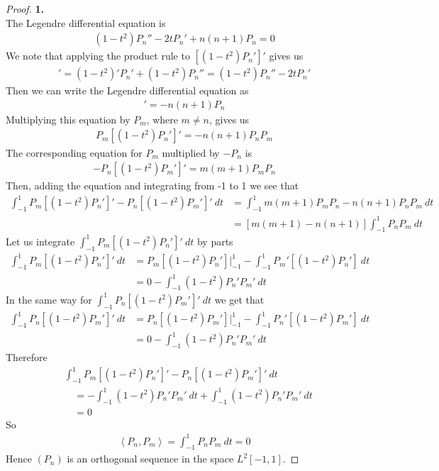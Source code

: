 \documentclass[11pt]{article}
\newcommand{\inprd}[1]{\left\langle{#1}\right\rangle}
\theoremstyle{definition}
\begin{document}
\begin{proof}{\textbf{1.}}\\
The Legendre differential equation is
\begin{align*}
    (1 - t^2)P_n'' - 2tP_n' + n(n + 1)P_n = 0
\end{align*}
We note that applying the product rule to $[(1 - t^2)P_n']'$ gives us
\begin{align*}
    [(1 - t^2)P_n']' = (1 - t^2)'P_n' + (1 - t^2)P_n''
    = (1 - t^2)P_n'' - 2tP_n'
\end{align*}
Then we can write the Legendre differential equation as
\begin{align*}
    [(1 - t^2)P_n']' = -n(n + 1)P_n 
\end{align*}
Multiplying this equation by $P_m$, where $m \neq n$, gives us
\begin{align*}
    P_m[(1 - t^2)P_n']' = -n(n + 1)P_nP_m
\end{align*}
The corresponding equation for $P_m$ multiplied by $-P_n$ is
\begin{align*}
    -P_n[(1 - t^2)P_m']' = m(m + 1)P_mP_n
\end{align*}
Then, adding the equation and integrating from -1 to 1 we see that
\begin{align*}
    \int_{-1}^1 P_m[(1 - t^2)P_n']' -P_n[(1 - t^2)P_m']'~dt
    &= \int_{-1}^1 m(m + 1)P_mP_n -n(n + 1)P_nP_m ~dt\\
    &= [m(m + 1) -n(n + 1)]\int_{-1}^1 P_nP_m~dt
\end{align*}
Let us integrate $\int_{-1}^1 P_m[(1 - t^2)P_n']'~dt$ by parts 
\begin{align*}
    \int_{-1}^1 P_m[(1 - t^2)P_n']'~dt
    &= P_m[(1 - t^2)P_n'] \bigg|_{-1}^1 - \int_{-1}^1 P_m'[(1 - t^2)P_n']~dt\\
    &= 0 - \int_{-1}^1 (1 - t^2)P_n'P_m'~dt
\end{align*}
In the same way for $\int_{-1}^1 P_n[(1 - t^2)P_m']'~dt$ we get that
\begin{align*}
    \int_{-1}^1 P_n[(1 - t^2)P_m']'~dt
    &= P_n[(1 - t^2)P_m'] \bigg|_{-1}^1 - \int_{-1}^1 P_n'[(1 - t^2)P_m']~dt\\
    &= 0 - \int_{-1}^1 (1 - t^2)P_n'P_m'~dt
\end{align*}
Therefore
\begin{align*}
    &\int_{-1}^1 P_m[(1 - t^2)P_n']' -P_n[(1 - t^2)P_m']'~dt\\
    &\quad= - \int_{-1}^1 (1 - t^2)P_n'P_m'~dt + \int_{-1}^1 (1 - t^2)P_n'P_m'~dt\\
    &\quad= 0
\end{align*}
So
\begin{align*}
    \inprd{P_n, P_m} = \int_{-1}^1 P_nP_m~dt = 0
\end{align*}
Hence $(P_n)$ is an orthogonal sequence in the space $L^2[-1,1]$.

\end{proof}
\end{document}
